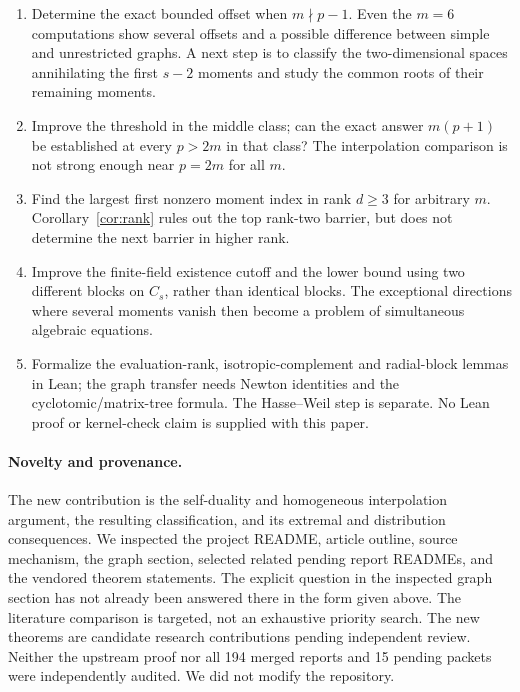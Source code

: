 \documentclass[11pt]{article}
\theoremstyle{remark}\newtheorem{remark}[theorem]{Remark}
\begin{document}
\begin{enumerate}
\item Determine the exact bounded offset when $m\nmid p-1$. Even the $m=6$ computations show several offsets and a possible difference between simple and unrestricted graphs. A next step is to classify the two-dimensional spaces annihilating the first $s-2$ moments and study the common roots of their remaining moments.
\item Improve the threshold in the middle class; can the exact answer $m(p+1)$ be established at every $p>2m$ in that class? The interpolation comparison is not strong enough near $p=2m$ for all $m$.
\item Find the largest first nonzero moment index in rank $d\ge3$ for arbitrary $m$. Corollary~\ref{cor:rank} rules out the top rank-two barrier, but does not determine the next barrier in higher rank.
\item Improve the finite-field existence cutoff and the lower bound using two different blocks on $C_s$, rather than identical blocks. The exceptional directions where several moments vanish then become a problem of simultaneous algebraic equations.
\item Formalize the evaluation-rank, isotropic-complement and radial-block lemmas in Lean; the graph transfer needs Newton identities and the cyclotomic/matrix-tree formula. The Hasse--Weil step is separate. No Lean proof or kernel-check claim is supplied with this paper.
\end{enumerate}

\paragraph{Novelty and provenance.} The new contribution is the self-duality and homogeneous interpolation argument, the resulting classification, and its extremal and distribution consequences. We inspected the project README, article outline, source mechanism, the graph section, selected related pending report READMEs, and the vendored theorem statements. The explicit question in the inspected graph section has not already been answered there in the form given above. The literature comparison \cite{dubose,dion} is targeted, not an exhaustive priority search. The new theorems are candidate research contributions pending independent review. Neither the upstream proof nor all 194 merged reports and 15 pending packets were independently audited. We did not modify the repository.
\end{document}
